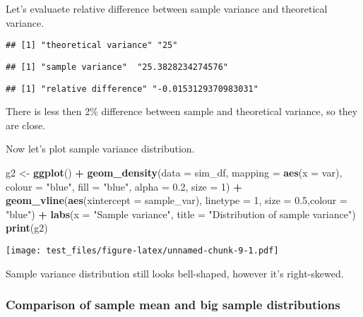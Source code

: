 \documentclass[]{article}
\newenvironment{Shaded}{\begin{snugshade}}{\end{snugshade}}
\newcommand{\KeywordTok}[1]{\textcolor[rgb]{0.13,0.29,0.53}{\textbf{#1}}}
\newcommand{\DataTypeTok}[1]{\textcolor[rgb]{0.13,0.29,0.53}{#1}}
\newcommand{\DecValTok}[1]{\textcolor[rgb]{0.00,0.00,0.81}{#1}}
\newcommand{\FloatTok}[1]{\textcolor[rgb]{0.00,0.00,0.81}{#1}}
\newcommand{\StringTok}[1]{\textcolor[rgb]{0.31,0.60,0.02}{#1}}
\newcommand{\OperatorTok}[1]{\textcolor[rgb]{0.81,0.36,0.00}{\textbf{#1}}}
\newcommand{\NormalTok}[1]{#1}
\begin{document}
Let's evaluaete relative difference between sample variance and
theoretical variance.

\begin{verbatim}
## [1] "theoretical variance" "25"
\end{verbatim}

\begin{verbatim}
## [1] "sample variance"  "25.3828234274576"
\end{verbatim}

\begin{verbatim}
## [1] "relative difference" "-0.0153129370983031"
\end{verbatim}

There is less then 2\% difference between sample and theoretical
variance, so they are close.

Now let's plot sample variance distribution.

\begin{Shaded}
\begin{Highlighting}[]
\NormalTok{g2 <-}\StringTok{ }\KeywordTok{ggplot}\NormalTok{() }\OperatorTok{+}\StringTok{ }
\StringTok{  }\KeywordTok{geom_density}\NormalTok{(}\DataTypeTok{data =}\NormalTok{ sim_df, }\DataTypeTok{mapping =} \KeywordTok{aes}\NormalTok{(}\DataTypeTok{x =}\NormalTok{ var), }\DataTypeTok{colour =} \StringTok{"blue"}\NormalTok{, }\DataTypeTok{fill =} \StringTok{"blue"}\NormalTok{, }\DataTypeTok{alpha =} \FloatTok{0.2}\NormalTok{, }\DataTypeTok{size =} \DecValTok{1}\NormalTok{) }\OperatorTok{+}
\StringTok{  }\KeywordTok{geom_vline}\NormalTok{(}\KeywordTok{aes}\NormalTok{(}\DataTypeTok{xintercept =}\NormalTok{ sample_var), }\DataTypeTok{linetype =} \DecValTok{1}\NormalTok{, }\DataTypeTok{size =} \FloatTok{0.5}\NormalTok{,}\DataTypeTok{colour =} \StringTok{"blue"}\NormalTok{) }\OperatorTok{+}
\StringTok{  }\KeywordTok{labs}\NormalTok{(}\DataTypeTok{x =} \StringTok{"Sample variance"}\NormalTok{, }\DataTypeTok{title =} \StringTok{"Distribution of sample variance"}\NormalTok{)}
\KeywordTok{print}\NormalTok{(g2)}
\end{Highlighting}
\end{Shaded}

\texttt{[image: test\_files/figure-latex/unnamed-chunk-9-1.pdf]}

Sample variance distribution still looks bell-shaped, however it's
right-skewed.

\subsubsection{Comparison of sample mean and big sample
distributions}\label{comparison-of-sample-mean-and-big-sample-distributions}
\end{document}
